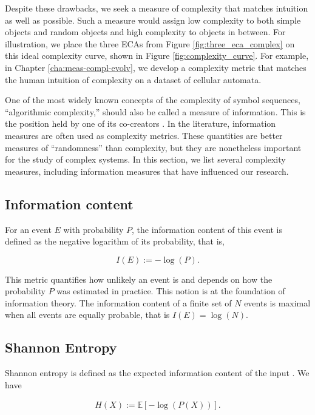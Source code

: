 Despite these drawbacks, we seek a measure of complexity that matches intuition
as well as possible. Such a measure would assign low complexity to both simple
objects and random objects and high complexity to objects in between. For
illustration, we place the three \acp{ECA} from Figure
\ref{fig:three_eca_complex} on this ideal complexity curve, shown in Figure
\ref{fig:complexity_curve}. For example, in Chapter \ref{cha:meas-compl-evolv},
we develop a complexity metric that matches the human intuition of complexity on a
dataset of cellular automata.

One of the most widely known concepts of the complexity of symbol
sequences, ``algorithmic complexity,'' should also be called a measure of
information. This is the position held by one of its co-creators
\parencite{chaitinInformationRandomnessIncompleteness1990}. In the literature,
information measures are often used as complexity metrics. These quantities
are better measures of ``randomness'' than complexity, but they are nonetheless
important for the study of complex systems. In this section, we list several
complexity measures, including information measures that have influenced our
research.

\subsection{Information content}
For an event $E$ with probability $P$, the information content of this event is
defined as the negative logarithm of its probability, that is,

\begin{equation}
  I(E) :=  -\log(P).
\end{equation}

This metric quantifies how unlikely an event is and depends on how the
probability $P$ was estimated in practice. This notion is at the foundation of
information theory. The information content of a finite set of $N$ events is maximal 
when all events are equally probable, that is $I(E) = \log(N)$.

\subsection{Shannon Entropy}
Shannon entropy is defined as the expected information content of the input
\parencite{shannonMathematicalTheoryCommunication1975}. We have

\begin{align*}
  H(X) := \mathbb{E}[-\log(P(X))].
\end{align*}

